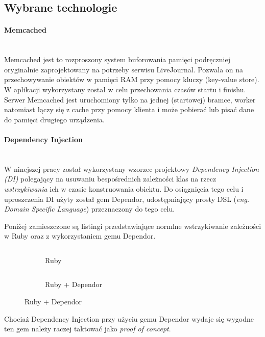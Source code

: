 \documentclass[11pt,a4paper, twoside]{article}
\begin{document}
\subsection{Wybrane technologie}
\paragraph{Memcached} ~\\
\newline
Memcached jest to rozproszony system buforowania pamięci podręczniej oryginalnie zaprojektowany na potrzeby serwisu  LiveJournal. Pozwala on na przechowywanie obiektów w pamięci RAM przy pomocy kluczy (key-value store). W aplikacji wykorzystany został w celu przechowania czasów startu i finishu. Serwer Memcached jest uruchomiony tylko na jednej (startowej) bramce, worker natomiast łączy się z cache przy pomocy klienta i może pobierać lub pisać dane do pamięci drugiego urządzenia.
\newpage
\paragraph{Dependency Injection} ~\\
\newline
W ninejszej pracy został wykorzystany wzorzec projektowy \emph{Dependency Injection (DI)} polegający na usuwaniu bespośrednich zależności klas na rzecz \emph{wstrzykiwania} ich w czasie konstruowania obiektu. Do osiągnięcia tego celu i uproszczenia  DI użyty został gem Dependor, udostępniający prosty DSL (\emph{eng. Domain Specific Language}) przeznaczony do tego celu.

Poniżej zamieszczone są listingi przedstawiające normlne wstrzykiwanie zależności w Ruby oraz z wykorzystaniem gemu Dependor.
\newline


\begin{figure}[h]
\centering
\begin{subfigure}[t]{0.45\textwidth}
\caption{Ruby}
\begin{listing}[H]
\inputminted[linenos=true]{ruby}{./src/di_ruby.rb}
\end{listing}
\end{subfigure}
\begin{subfigure}[t]{0.45\textwidth}
\caption{Ruby + Dependor}
\begin{listing}[H]
\inputminted{ruby}{./src/di_dependor.rb}
\end{listing}
\end{subfigure}
\end{figure}
\noindent
Chociaż Dependency Injection przy użyciu gemu Dependor wydaje się wygodne ten gem należy raczej taktować jako \emph{proof of concept}.
\end{document}
